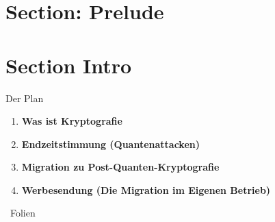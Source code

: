 \section{Section: Prelude}

\section{Section Intro}

\begin{frame}[c]{Der Plan}
  \small

  \begin{enumerate}
    \item \textbf{Was ist Kryptografie}
    \item \textbf{Endzeitstimmung (Quantenattacken)}
    \item \textbf{Migration zu Post-Quanten-Kryptografie}
    \item \textbf{Werbesendung (Die Migration im Eigenen Betrieb)}
  \end{enumerate}

	\vfill
	~Folien

  \vfill
\end{frame}



